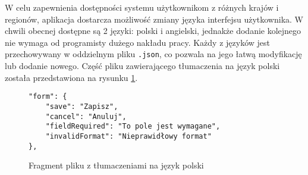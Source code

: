 W celu zapewnienia dostępności systemu użytkownikom z różnych krajów i regionów, aplikacja dostarcza możliwość zmiany języka interfejsu użytkownika. W chwili obecnej dostępne są 2 języki: polski i angielski, jednakże dodanie kolejnego nie wymaga od programisty dużego nakładu pracy. Każdy z języków jest przechowywany w oddzielnym pliku \texttt{.json}, co pozwala na jego łatwą modyfikację lub dodanie nowego. Część pliku zawierającego tłumaczenia na język polski została przedstawiona na rysunku \ref{lst:pl}.

\begin{figure}[H]
    \begin{verbatim}
"form": {
    "save": "Zapisz",
    "cancel": "Anuluj",
    "fieldRequired": "To pole jest wymagane",
    "invalidFormat": "Nieprawidłowy format"
},
\end{verbatim}
    \caption{Fragment pliku z tłumaczeniami na język polski}
    \label{lst:pl}
\end{figure}